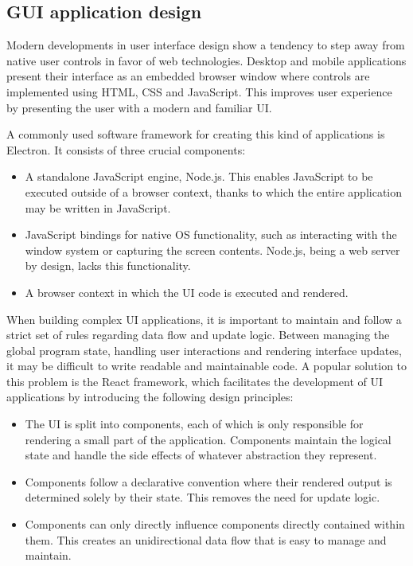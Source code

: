 \subsection{GUI application design}

Modern developments in user interface design show a tendency to step away from
native user controls in favor of web technologies. Desktop and mobile
applications present their interface as an embedded browser window where
controls are implemented using HTML, CSS and JavaScript. This improves user
experience by presenting the user with a modern and familiar UI.

A commonly used software framework for creating this kind of applications is
Electron. It consists of three crucial components:
\begin{itemize}
    \item A standalone JavaScript engine, Node.js. This enables JavaScript to
    be executed outside of a browser context, thanks to which the entire
    application may be written in JavaScript.
    \item JavaScript bindings for native OS functionality, such as interacting
    with the window system or capturing the screen contents. Node.js, being a
    web server by design, lacks this functionality.
    \item A browser context in which the UI code is executed and rendered.
\end{itemize}

When building complex UI applications, it is important to maintain and follow
a strict set of rules regarding data flow and update logic. Between managing
the global program state, handling user interactions and rendering interface
updates, it may be difficult to write readable and maintainable code. A popular
solution to this problem is the React framework, which facilitates the
development of UI applications by introducing the following design principles:
\begin{itemize}
    \item The UI is split into components, each of which is only responsible
    for rendering a small part of the application. Components maintain the
    logical state and handle the side effects of whatever abstraction they
    represent.
    \item Components follow a declarative convention where their rendered
    output is determined solely by their state. This removes the need for
    update logic.
    \item Components can only directly influence components directly contained
    within them. This creates an unidirectional data flow that is easy to manage
    and maintain.
\end{itemize}
